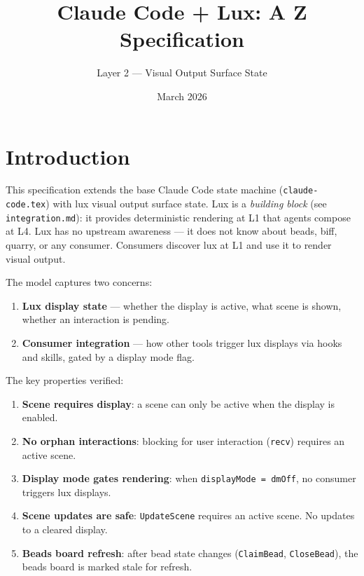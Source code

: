 \documentclass[a4paper,10pt,fleqn]{article}
\begin{document}
\title{Claude Code + Lux: A Z Specification}
\author{Layer 2 --- Visual Output Surface State}
\date{March 2026}
\maketitle

\tableofcontents
\newpage

\section{Introduction}

This specification extends the base Claude Code state machine
(\texttt{claude-code.tex}) with lux visual output surface state.
Lux is a \emph{building block} (see \texttt{integration.md}): it
provides deterministic rendering at L1 that agents compose at L4.
Lux has no upstream awareness --- it does not know about beads,
biff, quarry, or any consumer. Consumers discover lux at L1 and
use it to render visual output.

The model captures two concerns:

\begin{enumerate}
  \item \textbf{Lux display state} --- whether the display is active,
    what scene is shown, whether an interaction is pending.
  \item \textbf{Consumer integration} --- how other tools trigger
    lux displays via hooks and skills, gated by a display mode flag.
\end{enumerate}

The key properties verified:

\begin{enumerate}
  \item \textbf{Scene requires display}: a scene can only be active
    when the display is enabled.
  \item \textbf{No orphan interactions}: blocking for user interaction
    (\texttt{recv}) requires an active scene.
  \item \textbf{Display mode gates rendering}: when
    \texttt{displayMode = dmOff}, no consumer triggers lux displays.
  \item \textbf{Scene updates are safe}: \texttt{UpdateScene} requires
    an active scene. No updates to a cleared display.
  \item \textbf{Beads board refresh}: after bead state changes
    (\texttt{ClaimBead}, \texttt{CloseBead}), the beads board is
    marked stale for refresh.
\end{enumerate}
\end{document}
